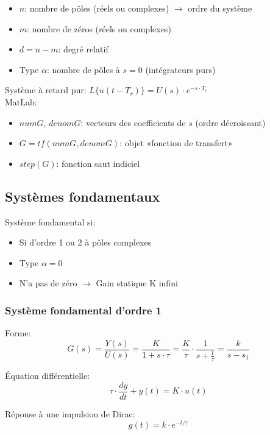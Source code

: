 \documentclass[10pt, twocolumn]{article}
\begin{document}
			\begin{itemize}
				\item $n$: nombre de pôles (réels ou complexes) $\rightarrow$ ordre du système
				\item $m$: nombre de zéros (réels ou complexes)
				\item $d=n-m$: degré relatif
				\item Type $\alpha$: nombre de pôles à $s=0$ (intégrateurs purs)
			\end{itemize}
			
			Système à retard pur: $ L{\{u(t-T_r)\}} = U(s) \cdot e^{-s\cdot T_r}$ \\
			
			MatLab:
			
			\begin{itemize}
				\item $numG$, $denomG$: vecteurs des coefficients de $s$ (ordre décroissant)
				\item $G = tf(numG, denomG)$: objet «fonction de transfert»
				\item $step(G)$: fonction saut indiciel
			\end{itemize}
		
		\subsection*{Systèmes fondamentaux}
			
			Système fondamental si:
			
				\begin{itemize}
					\item Si d'ordre 1 ou 2 à pôles complexes
					\item Type $\alpha = 0$
					\item N'a pas de zéro $\rightarrow$ Gain statique K infini
				\end{itemize}
				
			\subsubsection*{Système fondamental d'ordre 1}
			
				Forme:
				\[G(s)=\frac{Y(s)}{U(s)}=\frac{K}{1+s \cdot \tau}=\frac{K}{\tau} \cdot \frac{1}{s+\frac{1}{\tau}}=\frac{k}{s-s_{1}}\]
				
				Équation différentielle:
				\[\tau \cdot \frac{d y}{d t}+y(t)=K \cdot u(t)\]
				
				Réponse à une impulsion de Dirac:
				\[g(t) = k \cdot e^{-t/\tau}\]
				
\end{document}
